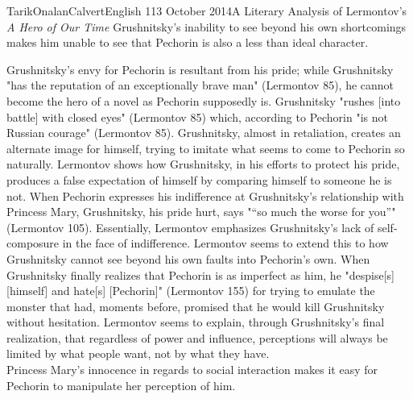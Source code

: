 \documentclass[12pt]{article}
\begin{document}
\begin{mla}{Tarik}{Onalan}{Calvert}{English 1}{13 October 2014}{A Literary Analysis of Lermontov's \textit{A Hero of Our Time}}
        Grushnitsky's inability to see beyond his own shortcomings makes him unable
        to see that Pechorin is also a less than ideal character.

        Grushnitsky's envy for Pechorin is resultant from his pride; while Grushnitsky
        "has the reputation of an exceptionally brave man" (Lermontov 85), he cannot
        become the hero of a novel as Pechorin supposedly is. Grushnitsky
        "rushes [into battle] with closed eyes" (Lermontov 85) which, according to Pechorin
        "is not Russian courage" (Lermontov 85). Grushnitsky, almost in retaliation, creates
        an alternate image for himself, trying to imitate what seems to come to Pechorin so
        naturally. Lermontov shows how Grushnitsky, in his efforts to protect his pride,
        produces a false expectation of himself by comparing himself to someone he is not.
        When Pechorin expresses his indifference at Grushnitsky's relationship with
        Princess Mary, Grushnitsky, his pride hurt, says "\enquote{so much the worse
        for you}" (Lermontov 105). Essentially, Lermontov emphasizes Grushnitsky's lack
        of self-composure in the face of indifference. Lermontov seems to extend this
        to how Grushnitsky cannot see beyond his own faults into Pechorin's own. When
        Grushnitsky finally realizes that Pechorin is as imperfect as him, he "despise[s]
        [himself] and hate[s] [Pechorin]" (Lermontov 155) for trying to emulate the monster
        that had, moments before, promised that he would kill Grushnitsky without hesitation.
        Lermontov seems to explain, through Grushnitsky's final realization, that
        regardless of power and influence, perceptions will always be limited by what
        people want, not by what they have.\\

        Princess Mary's innocence in regards to social interaction makes it easy for
        Pechorin to manipulate her perception of him.
        

\end{mla}
\end{document}
